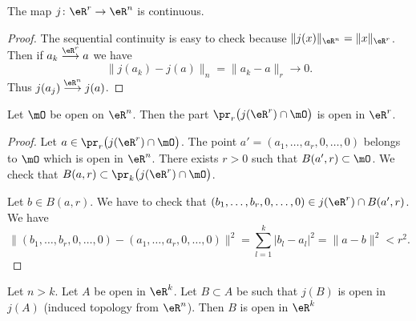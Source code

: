 \begin{lemma}	\label{LEMooUBLWooXnPzjn}
	The map \(j \colon \eR^r\to \eR^n  \) is continuous.
\end{lemma}

\begin{proof}
	The sequential continuity is easy to check because \( \| j(x) \|_{\eR^n}=\| x \|_{\eR^r}\). Then if \( a_k\stackrel{ \eR^r}{\longrightarrow} a\) we have
	\begin{equation}
		\| j(a_k)-j(a) \|_n=\| a_k-a \|_r\to 0.
	\end{equation}
	Thus \( j(a_j)\stackrel{ \eR^n}{\longrightarrow} j(a)\).
\end{proof}

\begin{lemma}	\label{LEMooURMPooEBfsTF}
	Let \( \mO\) be open on \( \eR^n\). Then the part \( \pr_r\big( j(\eR^r)\cap \mO \big)\) is open in \( \eR^r\).
\end{lemma}

\begin{proof}
	Let \( a\in\pr_r\big( j(\eR^r)\cap \mO \big)\). The point \( a'=(a_1,\ldots,a_r,0,\ldots,0)\) belongs to \( \mO\) which is open in \( \eR^n\). There exists \( r>0\) such that \( B(a',r)\subset\mO\). We check that \( B(a,r)\subset \pr_k\big( j(\eR^r)\cap\mO \big)\).

	Let \( b\in B(a,r)\). We have to check that \( (b_1,\ldots,b_r,0,\ldots,0)\in j(\eR^r)\cap B(a',r)\). We have
	\begin{equation}
		\| (b_1,\ldots,b_r,0,\ldots,0)-(a_1,\ldots,a_r,0,\ldots,0) \|^2=\sum_{l=1}^k| b_l-a_l |^2=\| a-b \|^2<r^2.
	\end{equation}
\end{proof}

\begin{lemma}	\label{LEMooBIYBooHTFNsQ}
	Let \( n>k\). Let \( A\) be open in \( \eR^k\). Let \( B\subset A\) be such that \( j(B)\) is open in \( j(A)\) (induced topology from \( \eR^n\)). Then \( B\) is open in \( \eR^k\)
\end{lemma}

